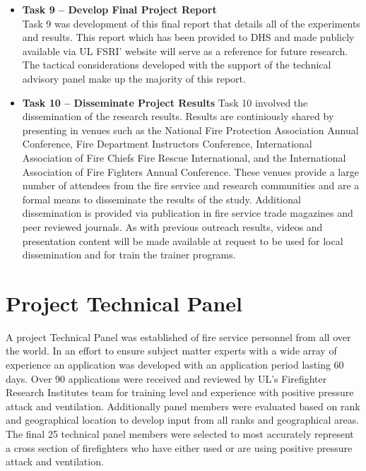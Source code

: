 \documentclass{article}
\begin{document}
\begin{itemize}
	\item \textbf{Task 9 – Develop Final Project Report} \\
	Task 9 was development of this final report that details all of the experiments and results. This report which has been provided to DHS and made publicly available via UL FSRI' website will serve as a reference for future research. The tactical considerations developed with the support of the technical advisory panel make up the majority of this report.
	
	\item \textbf{Task 10 – Disseminate Project Results}
	Task 10 involved the dissemination of the research results. Results are continiously shared by presenting in venues such as the National Fire Protection Association Annual Conference, Fire Department Instructors Conference, International Association of Fire Chiefs Fire Rescue International, and the International Association of Fire Fighters Annual Conference. These venues provide a large number of attendees from the fire service and research communities and are a formal means to disseminate the results of the study. Additional dissemination is provided via publication in fire service trade magazines and peer reviewed journals. As with previous outreach results, videos and presentation content will be made available at request to be used for local dissemination and for train the trainer programs. 

\end{itemize}

\section{Project Technical Panel}

A project Technical Panel was established of fire service personnel from all over the world. In an effort to ensure subject matter experts with a wide array of experience an application was developed with an application period lasting 60 days. Over 90 applications were received and reviewed by UL's Firefighter Research Institutes team for training level and experience with positive pressure attack and ventilation. Additionally panel members were evaluated based on rank and geographical location to develop input from all ranks and geographical areas. The final 25 technical panel members were selected to most accurately represent a cross section of firefighters who have either used or are using positive pressure attack and ventilation. 
\end{document}
